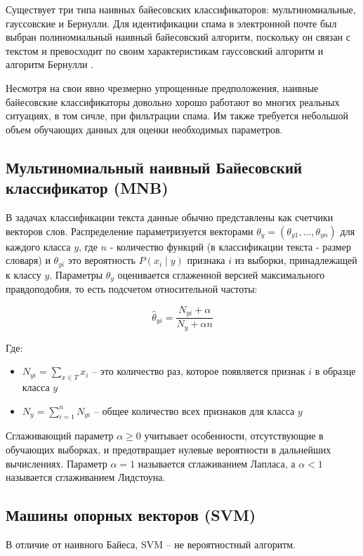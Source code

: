 Существует три типа наивных байесовских классификаторов: мультиномиальные, 
гауссовские и Бернулли. Для идентификации спама в электронной почте 
был выбран полиномиальный наивный байесовский алгоритм, поскольку он 
связан с текстом и превосходит по своим характеристикам гауссовский 
алгоритм и алгоритм Бернулли \cite{IEEE}.

Несмотря на свои явно чрезмерно упрощенные предположения, 
наивные байесовские классификаторы довольно хорошо работают 
во многих реальных ситуациях, в том сичле, при фильтрации 
спама. Им также требуется небольшой объем обучающих 
данных для оценки необходимых параметров. \cite{scikit}

\subsection{Мультиномиальный наивный Байесовский классификатор (MNB)}
В задачах классификации текста данные обычно представлены как счетчики векторов слов. 
Распределение параметризуется векторами $\theta_y = (\theta_{y1},\ldots,\theta_{yn})$ 
для каждого класса ${y}$, где ${n}$ - количество функций (в 
классификации текста - размер словаря) и $\theta_{yi}$ это вероятность 
$P(x_i \mid y)$ признака ${i}$ из выборки, принадлежащей к классу ${y}$.
Параметры $\theta_y$ оценивается сглаженной версией максимального правдоподобия, 
то есть подсчетом относительной частоты:

\begin{equation}\label{eq4}
    \hat{\theta}_{yi} = \frac{ N_{yi} + \alpha}{N_y + \alpha n}
\end{equation}

Где:
\begin{itemize}
    \item[\bullet] $N_{yi} = \sum_{x \in T} x_i$ -- это количество раз, 
    которое появляется признак ${i}$ в образце класса ${y}$
    \item[\bullet] $N_{y} = \sum_{i=1}^{n} N_{yi}$ -- общее количество всех признаков для класса ${y}$
\end{itemize}

Сглаживающий параметр $\alpha \ge 0$ учитывает особенности, отсутствующие 
в обучающих выборках, и предотвращает нулевые вероятности в дальнейших 
вычислениях. Параметр $\alpha = 1$ называется сглаживанием Лапласа, а $\alpha < 1$ 
называется сглаживанием Лидстоуна. \cite{scikit}

\subsection{Машины опорных векторов (SVM)}
В отличие от наивного Байеса, SVM -- не вероятностный алгоритм.

